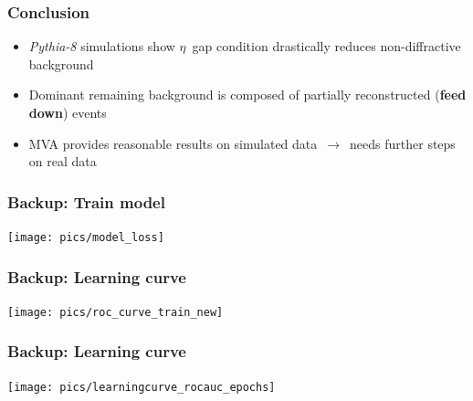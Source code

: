 \documentclass{beamer}
\begin{document}

{
\begin{frame}
    \frametitle{Conclusion}
    \begin{itemize}
        \item \emph{Pythia-8} simulations show $\eta$~gap condition drastically reduces non-diffractive background 
        \item Dominant remaining background is composed of partially reconstructed (\textbf{feed down}) events
        \item MVA provides reasonable results on simulated data~$\to$~needs further steps on real data
    \end{itemize}
\end{frame}
}



\begin{frame}
    \frametitle{Backup: Train model}
    \centering\texttt{[image: pics/model\_loss]}%
\end{frame}


\begin{frame}
    \frametitle{Backup: Learning curve}
    \centering\texttt{[image: pics/roc\_curve\_train\_new]}%
\end{frame}



\begin{frame}
    \frametitle{Backup: Learning curve}
    \centering\texttt{[image: pics/learningcurve\_rocauc\_epochs]}%
\end{frame}
\end{document}

